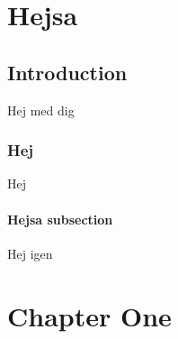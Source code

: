 \documentclass[paper=a4, fontsize=12pt, twoside, openright, titlepage=firstiscover,DIV=10]{scrbook}
\title{\Title} %
\author{\Author} %
\date{\Month~\Year} %
\begin{document}

{\pagestyle{plain}





\setcounter{page}{1} %





}
\clearpage
\pagestyle{fancy}




\tableofcontents




\chapter{Hejsa}
\section{Introduction}
Hej med dig
\newpage
\subsection{Hej}
Hej
\newpage
\subsubsection{Hejsa subsection}
Hej igen



\chapter{Chapter One}
\lipsum
\end{document}
